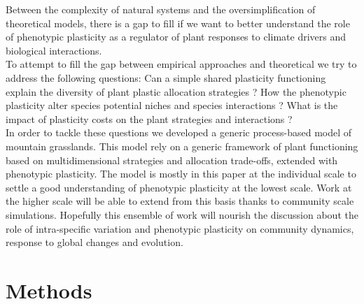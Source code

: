 \documentclass[review]{elsarticle}
\begin{document}
Between the complexity of natural systems and the oversimplification of theoretical models, there is a gap to fill if we want to better understand the role of phenotypic plasticity as a regulator of plant responses to climate drivers and biological interactions.\\

\indent To attempt to fill the gap between empirical approaches and theoretical we try to address the following questions: 
Can a simple shared plasticity functioning explain the diversity of plant plastic allocation strategies ?
How the phenotypic plasticity alter species potential niches and species interactions ?
What is the impact of plasticity costs on the plant strategies and interactions ?\\

\indent In order to tackle these questions we developed a generic process-based model of mountain grasslands. This model 
rely on a generic framework of plant functioning based on multidimensional strategies and allocation trade-offs, extended with phenotypic plasticity. The model is mostly in this paper at the individual scale to settle a good understanding of phenotypic plasticity at the lowest scale. Work at the higher scale will be able to extend from this basis thanks to community scale simulations. Hopefully this ensemble of work will nourish the discussion about the role of intra-specific variation and phenotypic plasticity on community dynamics, response to global changes and evolution.

%

\section{Methods}
\end{document}
